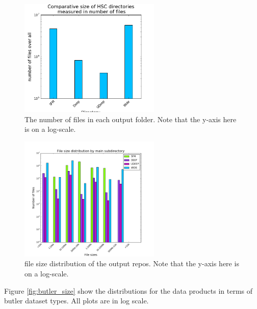 \documentclass[DM,authoryear,toc]{lsstdoc}
\begin{document}
\begin{figure}[htbp]
        \begin{center}
                 \includegraphics[width=0.6\textwidth]{figures/num_dir_files}
                 \caption{The number of files in each output folder. Note that the y-axis here is on a log-scale.}
                 \label{fig:num_dir_files}
        \end{center}
\end{figure}

\begin{figure}[htbp]
        \begin{center}
                 \includegraphics[width=0.6\textwidth]{figures/file_size_dist}
                 \caption{file size distribution of the output repos. Note that the y-axis here is on a log-scale.}
                 \label{fig:file_size_dist}
        \end{center}
\end{figure}

Figure \ref{fig:butler_size} show the distributions for the data products in terms of butler dataset types.  All plots are in log scale.
\end{document}
